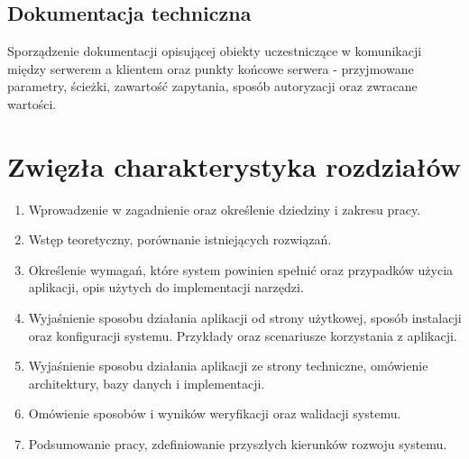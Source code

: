 \subsection{Dokumentacja techniczna}
Sporządzenie dokumentacji opisującej obiekty uczestniczące w komunikacji między serwerem a klientem oraz punkty końcowe serwera - przyjmowane parametry, ścieżki, zawartość zapytania, sposób autoryzacji oraz zwracane wartości. 
\section{Zwięzła charakterystyka rozdziałów}
\begin{enumerate}
\item Wprowadzenie w zagadnienie oraz określenie dziedziny i zakresu pracy.
\item Wstęp teoretyczny, porównanie istniejących rozwiązań.
\item Określenie wymagań, które system powinien spełnić oraz przypadków użycia aplikacji, opis użytych do implementacji narzędzi.
\item Wyjaśnienie sposobu działania aplikacji od strony użytkowej, sposób instalacji oraz konfiguracji systemu. Przykłady oraz scenariusze korzystania z aplikacji.
\item Wyjaśnienie sposobu działania aplikacji ze strony techniczne, omówienie architektury, bazy danych i implementacji.
\item Omówienie sposobów i wyników weryfikacji oraz walidacji systemu.
\item Podsumowanie pracy, zdefiniowanie przyszłych kierunków rozwoju systemu.
\end{enumerate}
